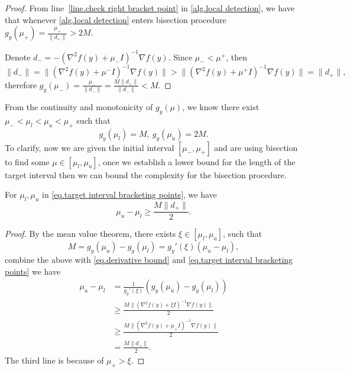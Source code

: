 \documentclass{article}
\begin{document}
\begin{proof}
    From line~\ref{line.check right bracket point} in \autoref{alg.local detection}, we have that whenever \autoref{alg.local detection} enters bisection procedure $g_y(\mu_+)=\frac{\mu_+}{\|d_+\|} >2M$.
    
    Denote $d_- = -\left(\nabla^2 f(y)+\mu_-I\right)^{-1}\nabla f(y)$. Since $\mu_- <\mu^+$, then
    \begin{equation*}
        \|d_-\|=\| \left (\nabla ^2 f(y)+\mu^- I\right )^{-1} \nabla f(y)\|>\| \left (\nabla ^2 f(y)+\mu^+ I\right )^{-1} \nabla f(y)\| = \|d_+\|,
    \end{equation*}
    therefore $g_y(\mu_-) = \frac{\mu_-}{\|d_-\|}=\frac{M\|d_+\|}{\|d_-\|}< M$.
\end{proof}
From the continuity and monotonicity of $g_y(\mu)$, we know there exist $\mu_-<\mu_l<\mu_u<\mu_+$ such that
\begin{equation}\label{eq.target interval bracketing points}
    g_{y}(\mu_l)=M, \ g_{y}(\mu_u)=2M.
\end{equation}
To clarify, now we are given the initial interval $[\mu_-,\mu_+]$ and are using bisection to find some $\mu\in[\mu_l,\mu_u]$, once we establish a lower bound for the length of the target interval then we can bound the complexity for the bisection procedure.
\begin{lemma}
    \label{lem.bound target interval}
    For $\mu_l,\mu_u$ in \eqref{eq.target interval bracketing points}, we have
    \begin{equation}
        \label{eq.bound target interval}
        \mu_u-\mu_l \geq \frac{M\|d_+\|}{2}.
    \end{equation}
\end{lemma}
\begin{proof}
    By the mean value theorem, there exists $\xi\in \left [\mu_l,\mu_u\right]$, such that
    \begin{equation*}
        M=g_y(\mu_u)-g_y(\mu_l) = g_y'(\xi)(\mu_u-\mu_l),
    \end{equation*}
    combine the above with \eqref{eq.derivative bound} and \eqref{eq.target interval bracketing points} we have
    \begin{equation*}
        \begin{aligned}
            \mu_u-\mu_l &=  \frac{1}{g_y'(\xi)}\left(g_y(\mu_u)-g_y(\mu_l)\right)\\
            &\geq \frac{M\|\left (\nabla ^2 f(y)+\xi I \right )^{-1}\nabla f(y)\|}{2}\\
            &\geq \frac{M\|\left (\nabla ^2 f(y)+\mu_+ I \right )^{-1}\nabla f(y)\|}{2}\\
            &= \frac{M\|d_+\|}{2}.
        \end{aligned}
    \end{equation*}
    The third line is because of $\mu_+ >\xi$.
\end{proof}
\end{document}
